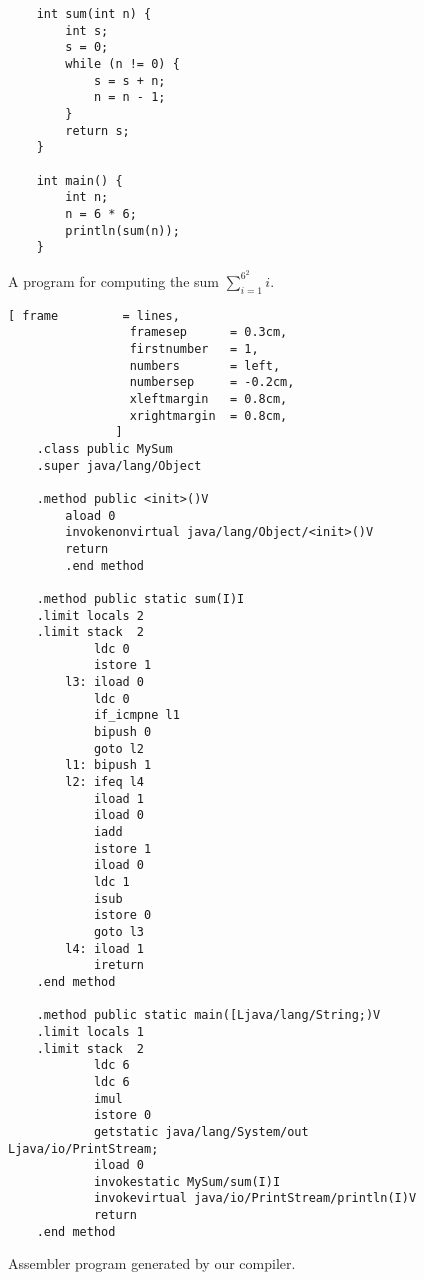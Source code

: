 \begin{figure}[!ht]
\centering
\begin{verbatim}
    int sum(int n) {
        int s;
        s = 0;
        while (n != 0) {
            s = s + n;
            n = n - 1;
        }
        return s;
    }
    
    int main() {
        int n;
        n = 6 * 6;
        println(sum(n));
    }
\end{verbatim}
\vspace*{-0.3cm}
\caption{A  program for computing the sum $\sum\limits_{i=1}^{6^2}i$.}
\label{fig:MySum.c2}
\end{figure}

\begin{figure}[!ht]
\centering
\begin{Verbatim}[ frame         = lines, 
                 framesep      = 0.3cm, 
                 firstnumber   = 1,
                 numbers       = left,
                 numbersep     = -0.2cm,
                 xleftmargin   = 0.8cm,
                 xrightmargin  = 0.8cm,
               ]
    .class public MySum
    .super java/lang/Object
    
    .method public <init>()V
        aload 0
        invokenonvirtual java/lang/Object/<init>()V
        return
        .end method
        
    .method public static sum(I)I
    .limit locals 2
    .limit stack  2
            ldc 0
            istore 1
        l3: iload 0
            ldc 0
            if_icmpne l1
            bipush 0
            goto l2
        l1: bipush 1
        l2: ifeq l4
            iload 1
            iload 0
            iadd
            istore 1
            iload 0
            ldc 1
            isub
            istore 0
            goto l3
        l4: iload 1
            ireturn
    .end method
            
    .method public static main([Ljava/lang/String;)V
    .limit locals 1
    .limit stack  2
            ldc 6
            ldc 6
            imul
            istore 0
            getstatic java/lang/System/out Ljava/io/PrintStream;
            iload 0
            invokestatic MySum/sum(I)I
            invokevirtual java/io/PrintStream/println(I)V
            return
    .end method
\end{Verbatim}
\vspace*{-0.3cm}
\caption{Assembler program generated by our compiler.}
\label{fig:MySum.jas}
\end{figure}

